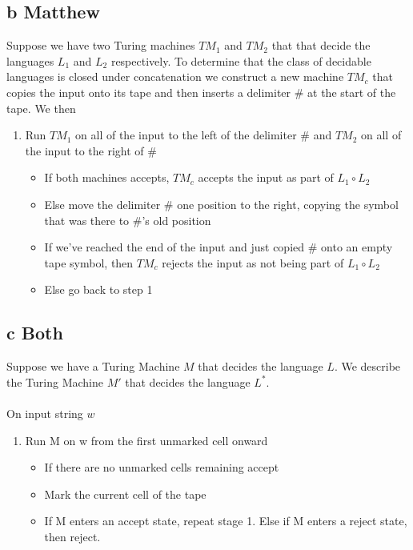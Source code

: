 \documentclass{article}
\begin{document}
\subsection*{b Matthew}
Suppose we have two Turing machines $TM_1$ and $TM_2$ that that decide the languages $L_1$ and $L_2$ respectively. To determine that the class of decidable languages is closed under concatenation we construct a new machine $TM_c$ that copies the input onto its tape and then inserts a delimiter $\#$ at the start of the tape. We then 
\begin{enumerate}
    \item Run $TM_1$ on all of the input to the left of the delimiter $\#$ and $TM_2$ on all of the input to the right of $\#$
    \begin{itemize}
        \item If both machines accepts, $TM_c$ accepts the input as part of $L_1 \circ L_2$
        \item Else move the delimiter $\#$ one position to the right, copying the symbol that was there to $\#$'s old position
        \item If we've reached the end of the input and just copied $\#$ onto an empty tape symbol, then $TM_c$ rejects the input as not being part of $L_1 \circ L_2$
        \item Else go back to step 1
    \end{itemize} 
    
    
\end{enumerate}

\subsection*{c Both}
Suppose we have a Turing Machine $M$ that decides the language $L$. We describe the Turing Machine $M'$ that decides the language $L^*$.\\\\
On input string $w$
\begin{enumerate}
    \item Run M on w from the first unmarked cell onward
    \begin{itemize}
        \item If there are no unmarked cells remaining accept
        \item Mark the current cell of the tape
        \item If M enters an accept state, repeat stage 1. Else if M enters a reject state, then reject.
    \end{itemize}
\end{enumerate}
\end{document}

